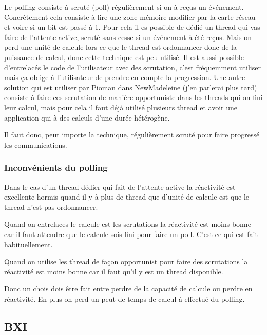 Le polling consiste à scruté (poll) régulièrement si on à reçus un événement.
Concrètement cela consiste à lire une zone mémoire modifier par la carte réseau et voire si un bit est passé à 1.
Pour cela il es possible de dédié un thread qui vas faire de l'attente active, scruté sans cesse si un événement à été reçus.
Mais on perd une unité de calcule lors ce que le thread est ordonnancer donc de la puissance de calcul, donc cette technique est peu utilisé. %
Il est aussi possible d'entrelacés le code de l'utilisateur avec des scrutation, c'est fréquemment utiliser mais ça oblige à l'utilisateur de prendre en compte la progression.
Une autre solution qui est utiliser par Pioman dans NewMadeleine (j'en parlerai plus tard) consiste à faire ces scrutation de manière opportuniste dans les threads qui on fini leur calcul, mais pour cela il faut déjà utilisé plusieurs thread et avoir une application qui à des calculs d'une durée hétérogène.

Il faut donc, peut importe la technique, régulièrement scruté pour faire progressé les communications.

\subsubsection{Inconvénients du polling}


Dans le cas d'un thread dédier qui fait de l'attente active la réactivité est excellente hormis quand il y à plus de thread que d'unité de calcule est que le thread n'est pas ordonnancer.

Quand on entrelaces le calcule est les scrutations la réactivité est moins bonne car il faut attendre que le calcule sois fini pour faire un poll.
C'est ce qui est fait habituellement.

Quand on utilise les thread de façon opportunist pour faire des scrutations la réactivité est moins bonne car il faut qu'il y est un thread disponible.

Donc un chois dois être fait entre perdre de la capacité de calcule ou perdre en réactivité.
En plus on perd un peut de temps de calcul à effectué du polling.

\subsection{BXI}

